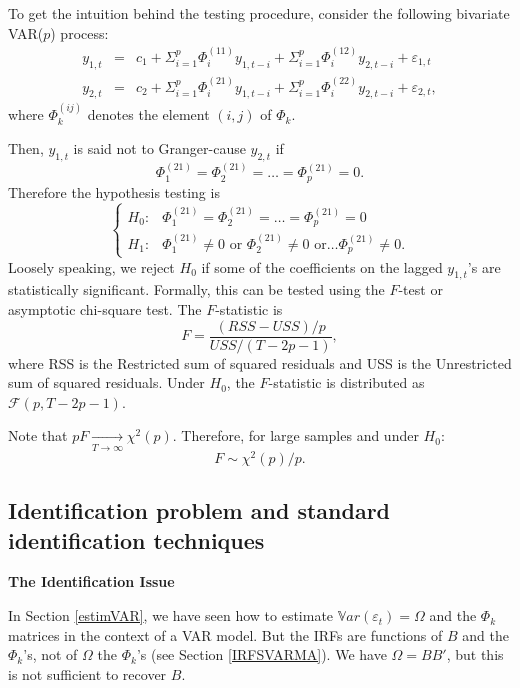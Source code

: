 \documentclass[
]{book}
\theoremstyle{definition}
\theoremstyle{definition}
\theoremstyle{definition}
\theoremstyle{definition}
\theoremstyle{remark}
\begin{document}
To get the intuition behind the testing procedure, consider the following
bivariate VAR(\(p\)) process:
\begin{eqnarray*}
y_{1,t} & = & c_1+\Sigma_{i=1}^{p}\Phi_i^{(11)}y_{1,t-i}+\Sigma_{i=1}^{p}\Phi_i^{(12)}y_{2,t-i}+\varepsilon_{1,t}\\
y_{2,t} & = & c_2+\Sigma_{i=1}^{p}\Phi_i^{(21)}y_{1,t-i}+\Sigma_{i=1}^{p}\Phi_i^{(22)}y_{2,t-i}+\varepsilon_{2,t},
\end{eqnarray*}
where \(\Phi_k^{(ij)}\) denotes the element \((i,j)\) of \(\Phi_k\).

Then, \(y_{1,t}\) is said not to Granger-cause \(y_{2,t}\) if
\[
\Phi_1^{(21)}=\Phi_2^{(21)}=\ldots=\Phi_p^{(21)}=0.
\]
Therefore the hypothesis testing is
\[
\begin{cases}
H_{0}: & \Phi_1^{(21)}=\Phi_2^{(21)}=\ldots=\Phi_p^{(21)}=0\\
H_{1}: & \Phi_1^{(21)}\neq0\mbox{ or }\Phi_2^{(21)}\neq0\mbox{ or}\ldots\Phi_p^{(21)}\neq0.\end{cases}
\]
Loosely speaking, we reject \(H_{0}\) if some of the coefficients on the lagged \(y_{1,t}\)'s are statistically significant. Formally, this can be tested using the \(F\)-test or asymptotic chi-square test. The \(F\)-statistic is
\[
F=\frac{(RSS-USS)/p}{USS/(T-2p-1)},
\]
where RSS is the Restricted sum of squared residuals and USS is the Unrestricted sum of squared residuals. Under \(H_{0}\), the \(F\)-statistic is distributed as \(\mathcal{F}(p,T-2p-1)\).

Note that \(pF\underset{T \rightarrow \infty}{\rightarrow}\chi^{2}(p)\). Therefore, for large samples and under \(H_0\):
\[
F \sim \chi^{2}(p)/p.
\]

\hypertarget{identification-problem-and-standard-identification-techniques}{%
\subsection{Identification problem and standard identification techniques}\label{identification-problem-and-standard-identification-techniques}}

\textbf{The Identification Issue}

In Section \ref{estimVAR}, we have seen how to estimate \(\mathbb{V}ar(\varepsilon_t) =\Omega\) and the \(\Phi_k\) matrices in the context of a VAR model. But the IRFs are functions of \(B\) and the \(\Phi_k\)'s, not of \(\Omega\) the \(\Phi_k\)'s (see Section \ref{IRFSVARMA}). We have \(\Omega = BB'\), but this is not sufficient to recover \(B\).
\end{document}
